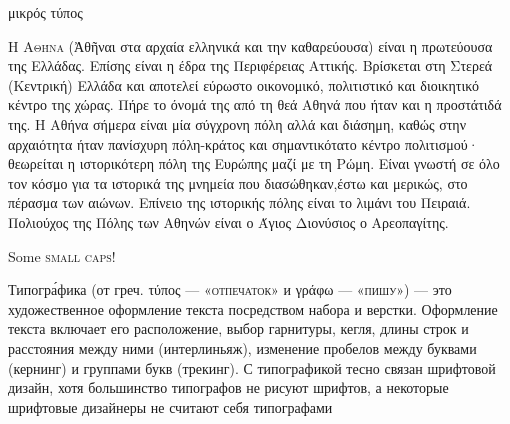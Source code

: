 \documentclass[10pt]{article}
\begin{document}
μικρός
τύπος

Η \textsc{Αθήνα} (Ἀθῆναι στα αρχαία ελληνικά και την καθαρεύουσα) είναι η
πρωτεύουσα της Ελλάδας. Επίσης είναι η έδρα της Περιφέρειας
Αττικής. Βρίσκεται στη Στερεά (Κεντρική) Ελλάδα και αποτελεί εύρωστο
οικονομικό, πολιτιστικό και διοικητικό κέντρο της χώρας. Πήρε το όνομά
της από τη θεά Αθηνά που ήταν και η προστάτιδά της. Η Αθήνα σήμερα
είναι μία σύγχρονη πόλη αλλά και διάσημη, καθώς στην αρχαιότητα ήταν
πανίσχυρη πόλη-κράτος και σημαντικότατο κέντρο πολιτισμού· θεωρείται η
ιστορικότερη πόλη της Ευρώπης μαζί με τη Ρώμη. Είναι γνωστή σε όλο τον
κόσμο για τα ιστορικά της μνημεία που διασώθηκαν,έστω και μερικώς, στο
πέρασμα των αιώνων. Επίνειο της ιστορικής πόλης είναι το λιμάνι του
Πειραιά. Πολιούχος της Πόλης των Αθηνών είναι ο Άγιος Διονύσιος ο
Αρεοπαγίτης.

Some \textsc{small caps}!

Типогра́фика (от греч. τύπος — «\textsc{отпечаток}» и γράφω — «\textsc{пишу}») — это 
художественное оформление текста посредством набора и верстки. 
Оформление текста включает его расположение, выбор гарнитуры, 
кегля, длины строк и расстояния между ними (интерлиньяж), 
изменение пробелов между буквами (кернинг) и группами букв (трекинг). 
С типографикой тесно связан шрифтовой дизайн, хотя большинство 
типографов не рисуют шрифтов, а некоторые шрифтовые дизайнеры 
не считают себя типографами
\end{document}
